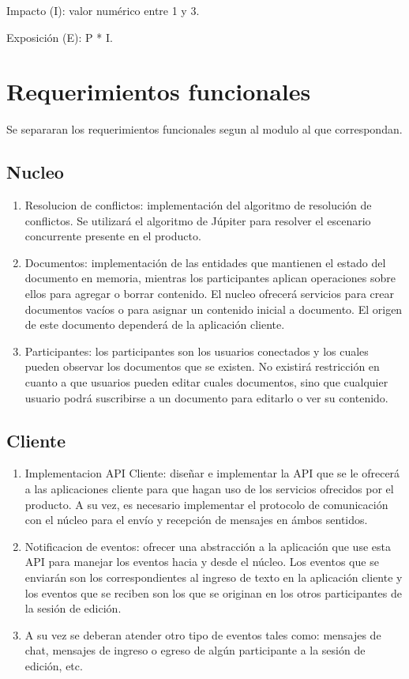 \documentclass[12pt,a4paper]{article}
\begin{document}
Impacto (I): valor numérico entre 1 y 3.

Exposición (E): P * I.

	\section{Requerimientos funcionales}
	
	Se separaran los requerimientos funcionales segun al modulo al que correspondan.

	\subsection{Nucleo}
	\begin{enumerate}
	\item Resolucion de conflictos: implementación del algoritmo de resolución de conflictos. Se utilizará el algoritmo de Júpiter \cite{jupiter} para resolver el escenario concurrente presente en el producto.
	\item Documentos: implementación de las entidades que mantienen el estado del documento en memoria, mientras los participantes aplican operaciones sobre ellos para agregar o borrar contenido. El nucleo ofrecerá servicios para crear documentos vacíos o para asignar un contenido inicial a documento. El origen de este documento dependerá de la aplicación cliente.
	\item Participantes: los participantes son los usuarios conectados y los cuales pueden observar los documentos que se existen. No existirá restricción en cuanto a que usuarios pueden editar cuales documentos, sino que cualquier usuario podrá suscribirse a un documento para editarlo o ver su contenido.
	
	\end{enumerate}


	\subsection{Cliente}

	\begin{enumerate}
\item Implementacion API Cliente: diseñar e implementar la API que se le ofrecerá a las aplicaciones cliente para que hagan uso de los servicios ofrecidos por el producto.
A su vez, es necesario implementar el protocolo de comunicación con el núcleo para el envío y recepción de mensajes en ámbos sentidos.

\item Notificacion de eventos: ofrecer una abstracción a la aplicación que use esta API para manejar los eventos hacia y desde el núcleo. Los eventos que se enviarán son los correspondientes al ingreso de texto en la aplicación cliente y los eventos que se reciben son los que se originan en los otros participantes de la sesión de edición.

\item A su vez se deberan atender otro tipo de eventos tales como: mensajes de chat, mensajes de ingreso o egreso de algún participante a la sesión de edición, etc.
	\end{enumerate}
\end{document}
